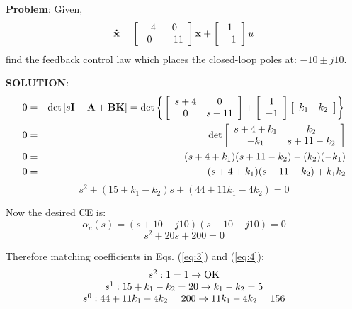 \textbf{Problem}: Given,
\[
{\bf{\dot x}} = \left[ {\begin{array}{*{20}c}
   { - 4} & 0  \\
   0 & { - 11}  \\
\end{array}} \right]{\bf{x}} + \left[ {\begin{array}{*{20}c}
   1  \\
   { - 1}  \\
\end{array}} \right]u
\]
find the feedback control law which places the closed-loop poles at: $-10\pm j10$.

\textbf{SOLUTION}:
\begin{eqnarray*}
	0 & = & \det \left[ {s{\bf{I}} - {\bf{A}} + {\bf{BK}}} \right] = \det \left\{ {\left. {\left[ {\begin{array}{*{20}c}
	   {s + 4} & 0  \\
	   0 & {s + 11}  \\
	\end{array}} \right] + \left[ {\begin{array}{*{20}c}
	   1  \\
	   { - 1}  \\
	\end{array}} \right]\left[ {\begin{array}{*{20}c}
	   {k_1 } & {k_2 }  \\
	\end{array}} \right]} \right\}} \right. \\
	0 & = & \det \left[ {\begin{array}{*{20}c}
	   {s + 4 + k_1 } & {k_2 }  \\
	   { - k_1 } & {s + 11 - k_2 }  \\
	\end{array}} \right] \\
	0 & = & (s + 4 + k_1 )(s + 11 - k_2 ) - (k_2 )( - k_1 ) \\
	0 & = & (s+4+k_1)(s+11-k_2)+k_1k_2
\end{eqnarray*}
\begin{equation}
	\label{eq:3}
	s^2+(15+k_1-k_2)s+(44+11k_1-4k_2)=0
\end{equation}

Now the desired CE is:
\[
\alpha_c(s)=(s+10-j10)(s+10-j10) = 0
\]
\begin{equation}\label{eq:4}
	s^2+20s+200=0
\end{equation}

Therefore matching coefficients in Eqs. (\ref{eq:3}) and (\ref{eq:4}):
\[
\begin{array}{c}
 s^2 :1 = 1 \to {\rm{OK}} \\ 
 s^1 :15 + k_1  - k_2  = 20 \to k_1  - k_2  = 5 \\ 
 s^0 :44 + 11k_1  - 4k_2  = 200 \to 11k_1  - 4k_2  = 156 \\ 
 \end{array}
\]

